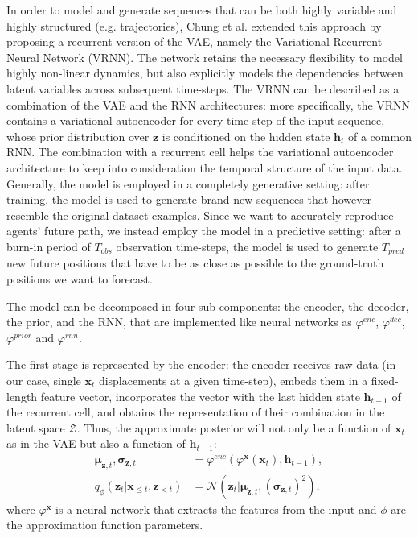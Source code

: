 \documentclass[10pt,a4paper,conference]{IEEEtran}
\begin{document}
In order to model and generate sequences that can be both highly variable and highly structured (e.g. trajectories), Chung et al. \cite{vrnn} extended this approach by proposing a recurrent version of the VAE, namely the Variational Recurrent Neural Network (VRNN). The network retains the necessary flexibility to model highly non-linear dynamics, but also explicitly models the dependencies between latent variables across subsequent time-steps. The VRNN can be described as a combination of the VAE and the RNN architectures: more specifically, the VRNN contains a variational autoencoder for every time-step of the input sequence, whose prior distribution over $\mathbf{z}$ is conditioned on the hidden state $\mathbf{h}_{t}$ of a common RNN. The combination with a recurrent cell helps the variational autoencoder architecture to keep into consideration the temporal structure of the input data. Generally, the model is employed in a completely generative setting: after training, the model is used to generate brand new sequences that however resemble the original dataset examples. Since we want to accurately reproduce agents' future path, we instead employ the model in a predictive setting: after a burn-in period of $T_{obs}$ observation time-steps, the model is used to generate $T_{pred}$ new future positions that have to be as close as possible to the ground-truth positions we want to forecast.  


The model can be decomposed in four sub-components: the encoder, the decoder, the prior, and the RNN, that are implemented like neural networks as $\varphi^{enc}$, $\varphi^{dec}$, $\varphi^{prior}$ and $\varphi^{rnn}$. 

The first stage is represented by the encoder: the encoder receives raw data (in our case, single $\mathbf{x}_{t}$ displacements at a given time-step), embeds them in a fixed-length feature vector, incorporates the vector with the last hidden state $\mathbf{h}_{t-1}$ of the recurrent cell, and obtains the representation of their combination in the latent space $\mathcal{Z}$. Thus, the approximate posterior will not only be a function of $\mathbf{x}_{t}$ as in the VAE but also a function of $\mathbf{h}_{t-1}$:
\begin{align}
\label{eq:vrnn_encoder}
    \pmb{\mu}_{\mathbf{z},t}, \pmb{\sigma}_{\mathbf{z},t} &= \varphi^{enc}\left(\varphi^{\mathbf{x}}(\mathbf{x}_{t}), \mathbf{h}_{t-1}\right), \\
    \label{eq:vrnn_infernce}
    q_{\phi}\left(\mathbf{z}_{t} | \mathbf{x}_{\leq t}, \mathbf{z}_{<t}\right) &=\mathcal{N}\left(\mathbf{z}_{t} | \boldsymbol{\mu}_{\mathbf{z},t},\left(\boldsymbol{\sigma}_{\mathbf{z},t }\right)^{2}\right),
\end{align}
where $\varphi^{\mathbf{x}}$ is a neural network that extracts the features from the input and $\phi$ are the approximation function parameters.
\end{document}
